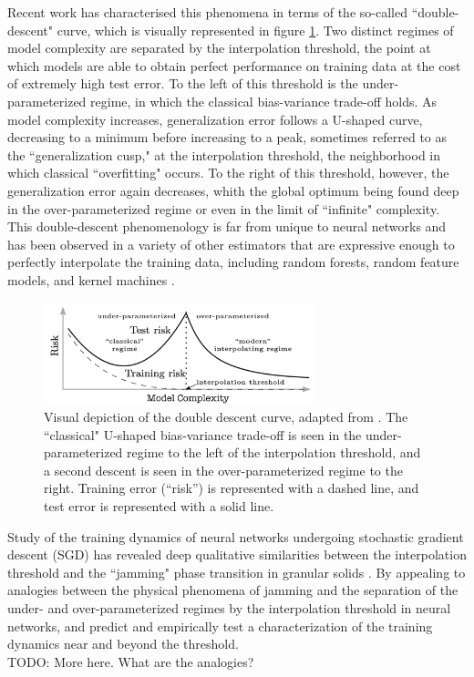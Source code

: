 \documentclass[a4paper, 12pt]{article}
\begin{document}
Recent work \cite{belkinReconcilingModernMachine2019} has characterised this phenomena in terms of the so-called ``double-descent" curve, which is visually represented in figure \ref{doubledescent}. Two distinct regimes of model complexity are separated by the interpolation threshold, the point at which models are able to obtain perfect performance on training data at the cost of extremely high test error. To the left of this threshold is the under-parameterized regime, in which the classical bias-variance trade-off holds. As model complexity increases, generalization error follows a U-shaped curve, decreasing to a minimum before increasing to a peak, sometimes referred to as the ``generalization cusp," at the interpolation threshold, the neighborhood in which classical ``overfitting" occurs. To the right of this threshold, however, the generalization error again decreases, whith the global optimum being found deep in the over-parameterized regime or even in the limit of ``infinite" complexity. This double-descent phenomenology is far from unique to neural networks and has been observed in a variety of other estimators that are expressive enough to perfectly interpolate the training data, including random forests, random feature models, and kernel machines \cite{ belkinReconcilingModernMachine2019, belkinUnderstandDeepLearning2018}.\\

\begin{figure}[ht]
\centering
\includegraphics[width=0.7\textwidth]{docs/assets/double_descent_reconciling.png}
\caption{Visual depiction of the double descent curve, adapted from \cite{belkinReconcilingModernMachine2019}. The ``classical" U-shaped bias-variance trade-off is seen in the under-parameterized regime to the left of the interpolation threshold, and a second descent is seen in the over-parameterized regime to the right. Training error (``risk'') is represented with a dashed line, and test error is represented with a solid line.}
\label{doubledescent}
\end{figure}


Study of the training dynamics of neural networks undergoing stochastic gradient descent (SGD)  has revealed deep qualitative similarities between the interpolation threshold and the ``jamming" phase transition in granular solids \cite{baity-jesiComparingDynamicsDeep2019, geigerJammingTransitionParadigm2019}. By appealing to analogies between the physical phenomena of jamming and the separation of the under- and over-parameterized regimes by the interpolation threshold in neural networks, \cite{geigerJammingTransitionParadigm2019} and \cite{spiglerJammingTransitionOverparametrization2019} predict and empirically test a characterization of the training dynamics near and beyond the threshold. 
\\
TODO: More here. What are the analogies? 
\\
\end{document}
